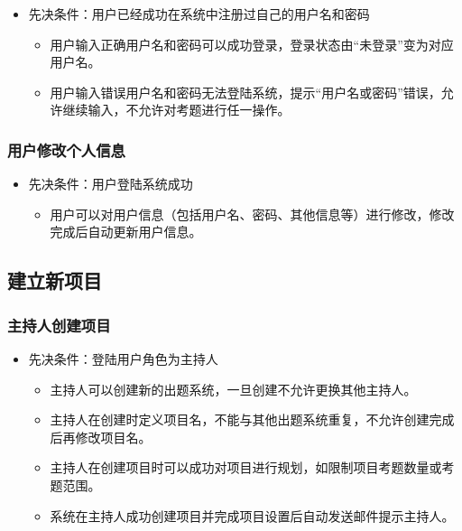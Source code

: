 \documentclass[hyperref, a4paper]{ctexart}
\providecommand{\tightlist}{%
  \setlength{\itemsep}{0pt}\setlength{\parskip}{0pt}}
\begin{document}
\begin{itemize}
\tightlist
\item
  先决条件：用户已经成功在系统中注册过自己的用户名和密码

  \begin{itemize}
  \tightlist
  \item
    用户输入正确用户名和密码可以成功登录，登录状态由``未登录''变为对应用户名。
  \item
    用户输入错误用户名和密码无法登陆系统，提示``用户名或密码''错误，允许继续输入，不允许对考题进行任一操作。
  \end{itemize}
\end{itemize}

\hypertarget{ux7528ux6237ux4feeux6539ux4e2aux4ebaux4fe1ux606f}{%
\subsubsection{用户修改个人信息}\label{ux7528ux6237ux4feeux6539ux4e2aux4ebaux4fe1ux606f}}

\begin{itemize}
\tightlist
\item
  先决条件：用户登陆系统成功

  \begin{itemize}
  \tightlist
  \item
    用户可以对用户信息（包括用户名、密码、其他信息等）进行修改，修改完成后自动更新用户信息。
  \end{itemize}
\end{itemize}

\hypertarget{ux5efaux7acbux65b0ux9879ux76ee}{%
\subsection{建立新项目}\label{ux5efaux7acbux65b0ux9879ux76ee}}

\hypertarget{ux4e3bux6301ux4ebaux521bux5efaux9879ux76ee}{%
\subsubsection{主持人创建项目}\label{ux4e3bux6301ux4ebaux521bux5efaux9879ux76ee}}

\begin{itemize}
\tightlist
\item
  先决条件：登陆用户角色为主持人

  \begin{itemize}
  \tightlist
  \item
    主持人可以创建新的出题系统，一旦创建不允许更换其他主持人。
  \item
    主持人在创建时定义项目名，不能与其他出题系统重复，不允许创建完成后再修改项目名。
  \item
    主持人在创建项目时可以成功对项目进行规划，如限制项目考题数量或考题范围。
  \item
    系统在主持人成功创建项目并完成项目设置后自动发送邮件提示主持人。
  \end{itemize}
\end{itemize}
\end{document}
